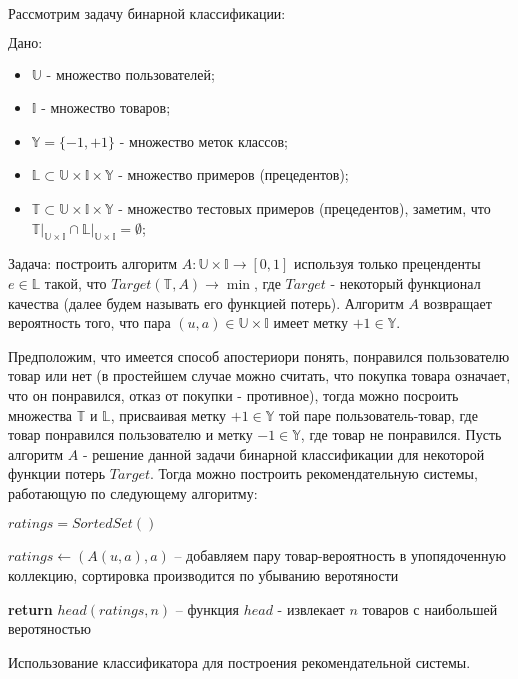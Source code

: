 \documentclass[12pt,a4paper]{report}
\begin{document}
Рассмотрим задачу бинарной классификации:

$\textit{Дано:}$
\begin{itemize}
\item $\mathbb{U}$ - множество пользователей;
\item $\mathbb{I}$ - множество товаров;
\item $\mathbb{Y} = \{-1,+1\}$ - множество меток классов;
\item $\mathbb{L} \subset \mathbb{U} \times \mathbb{I} \times \mathbb{Y}$ - множество примеров (прецедентов);
\item $\mathbb{T} \subset \mathbb{U} \times \mathbb{I} \times \mathbb{Y}$ - множество тестовых примеров (прецедентов), заметим, что $\mathbb{T|_{\mathbb{U} \times \mathbb{I}}} \cap \mathbb{L|_{\mathbb{U} \times \mathbb{I}}} = \emptyset$;
\end{itemize}
$\textit{Задача:}$ построить алгоритм $A: \mathbb{U} \times \mathbb{I} \to [0,1]$ используя только преценденты $e \in \mathbb{L} $ такой, что $Target(\mathbb{T}, A) \to \min$, где $Target$ - некоторый функционал качества (далее будем называть его функцией потерь). Алгоритм $A$ возвращает вероятность того, что пара $(u, a) \in  \mathbb{U} \times \mathbb{I}$ имеет метку $+1 \in \mathbb{Y}$.

Предположим, что имеется способ апостериори понять, понравился пользователю товар или нет (в простейшем случае можно считать, что покупка товара означает, что он понравился, отказ от покупки - противное), тогда можно посроить множества $\mathbb{T}$ и $\mathbb{L}$, присваивая метку $+1 \in \mathbb{Y}$ той паре пользователь-товар, где товар понравился пользователю и метку $-1 \in \mathbb{Y}$, где товар не понравился. Пусть алгоритм $A$ - решение данной задачи бинарной классификации для некоторой функции потерь $Target$. Тогда можно построить рекомендательную системы, работающую по следующему алгоритму:


\begin{algorithm}[H]
\SetAlgoLined
{}
$ratings = SortedSet()$

 {
	$ratings \leftarrow (A(u, a), a)$ -- добавляем пару товар-вероятность в упопядоченную коллекцию, сортировка производится по убыванию веротяности
}

\textbf{return} $head(ratings, n)$ -- функция $head$ - извлекает $n$ товаров с наибольшей веротяностью
\caption{Использование классификатора для построения рекомендательной системы.}
\label{alg:CARS}
\end{algorithm}
\end{document}
